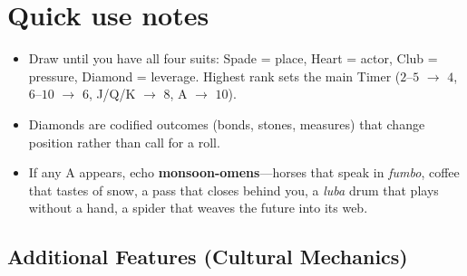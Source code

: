\section*{Quick use notes}
\label{sec:taharka-quick-use}
\begin{itemize}
\item Draw until you have all four suits: Spade = place, Heart = actor, Club = pressure, Diamond = leverage. Highest rank sets the main Timer ($2$--$5$ $\rightarrow$ $4$, $6$--$10$ $\rightarrow$ $6$, J/Q/K $\rightarrow$ $8$, A $\rightarrow$ $10$).
\item Diamonds are codified outcomes (bonds, stones, measures) that change position rather than call for a roll.
\item If any A appears, echo \textbf{monsoon-omens}---horses that speak in \textit{fumbo}, coffee that tastes of snow, a pass that closes behind you, a \textit{luba} drum that plays without a hand, a spider that weaves the future into its web.
\end{itemize}

\subsection{Additional Features (Cultural Mechanics)}
\label{sec:taharka-mechanics}

